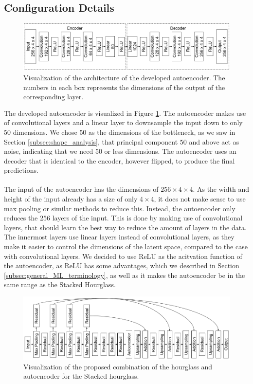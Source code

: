 \documentclass[./main.tex]{subfiles}
\begin{document}
\subsection{Configuration Details}\label{subsec:improv_conf_details}
\begin{figure}[htbp]
    \centering
    \includegraphics[width = \textwidth - 1 cm]{entities/Ae_model.png}
    \caption{Visualization of the architecture of the developed autoencoder. The numbers in each box represents the dimensions of the output of the corresponding layer.}
    \label{fig:AE_model}
\end{figure}
\noindent The developed autoencoder is visualized in Figure \ref{fig:AE_model}. The autoencoder makes use of convolutional layers and a linear layer to downsample the input down to only $50$ dimensions. We chose $50$ as the dimensions of the bottleneck, as we saw in Section \ref{subsec:shape_analysis}, that principal component $50$ and above act as noise, indicating that we need $50$ or less dimensions. The autoencoder uses an decoder that is identical to the encoder, however flipped, to produce the final predictions. 
\\
\\
The input of the autoencoder has the dimensions of $256 \times 4 \times 4$. As the width and height of the input already has a size of only $4 \times 4$, it does not make sense to use max pooling or similar methods to reduce this. Instead, the autoencoder only reduces the $256$ layers of the input. This is done by making use of convolutional layers, that should learn the best way to reduce the amount of layers in the data.  The innermost layers use linear layers instead of convolutional layers, as they make it easier to control the dimensions of the latent space, compared to the case with convolutional layers. We decided to use ReLU as the acitvation function of the autoencoder, as ReLU has some advantages, which we described in Section \ref{subsec:general_ML_terminology}, as well as it makes the autoencoder be in the same range as the Stacked Hourglass.
\\
\begin{figure}[htbp]
    \centering
    \includegraphics[width = \textwidth - 1 cm]{entities/SHG_AE.png}
    \caption{Visualization of the proposed combination of the hourglass and autoencoder for the Stacked hourglass.}
    \label{fig:SHG_AE}
\end{figure}
\end{document}

